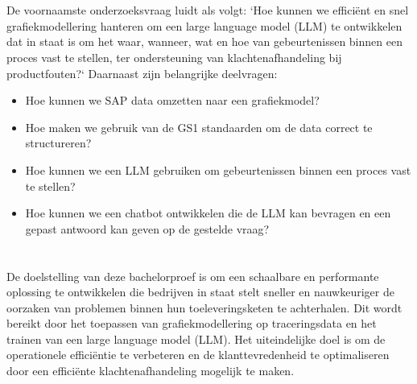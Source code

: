\section{}%
\label{sec:onderzoeksvraag}

De voornaamste onderzoeksvraag luidt als volgt: `Hoe kunnen we efficiënt en snel grafiekmodellering hanteren om een large language model (LLM) te ontwikkelen dat in staat is om het waar, wanneer, wat en hoe van gebeurtenissen binnen een proces vast te stellen, ter ondersteuning van klachtenafhandeling bij productfouten?`
Daarnaast zijn belangrijke deelvragen:
\begin{itemize}
    \item Hoe kunnen we SAP data omzetten naar een grafiekmodel?
    \item Hoe maken we gebruik van de GS1 standaarden om de data correct te structureren?
    \item Hoe kunnen we een LLM gebruiken om gebeurtenissen binnen een proces vast te stellen?
    \item Hoe kunnen we een chatbot ontwikkelen die de LLM kan bevragen en een gepast antwoord kan geven op de gestelde vraag?
\end{itemize}
\section{}%
\label{sec:onderzoeksdoelstelling}

De doelstelling van deze bachelorproef is om een schaalbare en performante oplossing te ontwikkelen die bedrijven in staat stelt sneller en nauwkeuriger de oorzaken van problemen binnen hun toeleveringsketen te achterhalen. 
Dit wordt bereikt door het toepassen van grafiekmodellering op traceringsdata en het trainen van een large language model (LLM). 
Het uiteindelijke doel is om de operationele efficiëntie te verbeteren en de klanttevredenheid te optimaliseren door een efficiënte klachtenafhandeling mogelijk te maken.

